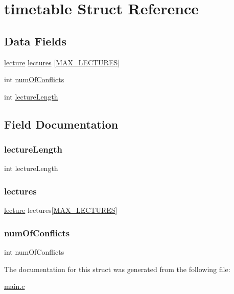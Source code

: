 \hypertarget{structtimetable}{}\section{timetable Struct Reference}
\label{structtimetable}
\subsection*{Data Fields}
\begin{DoxyCompactItemize}
\item 
\hyperlink{structlecture}{lecture} \hyperlink{structtimetable_a8a1f2b07250a066ed40e601dcb3c7da2}{lectures} \mbox{[}\hyperlink{main_8c_a152499a7a91751df0c7f203a60a88003}{M\+A\+X\+\_\+\+L\+E\+C\+T\+U\+R\+ES}\mbox{]}
\item 
int \hyperlink{structtimetable_a6b5984c472886301ccaf88155193b2fa}{num\+Of\+Conflicts}
\item 
int \hyperlink{structtimetable_ab137018dfc1d330a3a218446dbe4d4cb}{lecture\+Length}
\end{DoxyCompactItemize}


\subsection{Field Documentation}
\hypertarget{structtimetable_ab137018dfc1d330a3a218446dbe4d4cb}{}\label{structtimetable_ab137018dfc1d330a3a218446dbe4d4cb} 
\subsubsection{\texorpdfstring{lecture\+Length}{lectureLength}}
{\footnotesize\ttfamily int lecture\+Length}

\hypertarget{structtimetable_a8a1f2b07250a066ed40e601dcb3c7da2}{}\label{structtimetable_a8a1f2b07250a066ed40e601dcb3c7da2} 
\subsubsection{\texorpdfstring{lectures}{lectures}}
{\footnotesize\ttfamily \hyperlink{structlecture}{lecture} lectures\mbox{[}\hyperlink{main_8c_a152499a7a91751df0c7f203a60a88003}{M\+A\+X\+\_\+\+L\+E\+C\+T\+U\+R\+ES}\mbox{]}}

\hypertarget{structtimetable_a6b5984c472886301ccaf88155193b2fa}{}\label{structtimetable_a6b5984c472886301ccaf88155193b2fa} 
\subsubsection{\texorpdfstring{num\+Of\+Conflicts}{numOfConflicts}}
{\footnotesize\ttfamily int num\+Of\+Conflicts}



The documentation for this struct was generated from the following file\+:\begin{DoxyCompactItemize}
\item 
\hyperlink{main_8c}{main.\+c}\end{DoxyCompactItemize}
